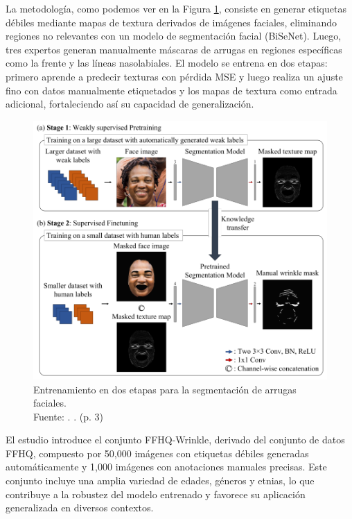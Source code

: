 La metodología, como podemos ver en la Figura \ref{2:fig11}, consiste en generar etiquetas débiles mediante mapas de textura derivados de imágenes faciales, eliminando regiones no relevantes con un modelo de segmentación facial (BiSeNet). Luego, tres expertos generan manualmente máscaras de arrugas en regiones específicas como la frente y las líneas nasolabiales. El modelo se entrena en dos etapas: primero aprende a predecir texturas con pérdida MSE y luego realiza un ajuste fino con datos manualmente etiquetados y los mapas de textura como entrada adicional, fortaleciendo así su capacidad de generalización.

\begin{figure}[!ht]
	\begin{center}
		\includegraphics[width=1\textwidth]{2/figures/metoart9.png}
		\caption[Entrenamiento en dos etapas para la segmentación de arrugas faciales]{Entrenamiento en dos etapas para la segmentación de arrugas faciales.\\
			Fuente: \cite{moon2024dermatology}. . (p. 3)}
		\label{2:fig11}
	\end{center}
\end{figure}

El estudio introduce el conjunto FFHQ-Wrinkle, derivado del conjunto de datos FFHQ, compuesto por 50,000 imágenes con etiquetas débiles generadas automáticamente y 1,000 imágenes con anotaciones manuales precisas. Este conjunto incluye una amplia variedad de edades, géneros y etnias, lo que contribuye a la robustez del modelo entrenado y favorece su aplicación generalizada en diversos contextos.

